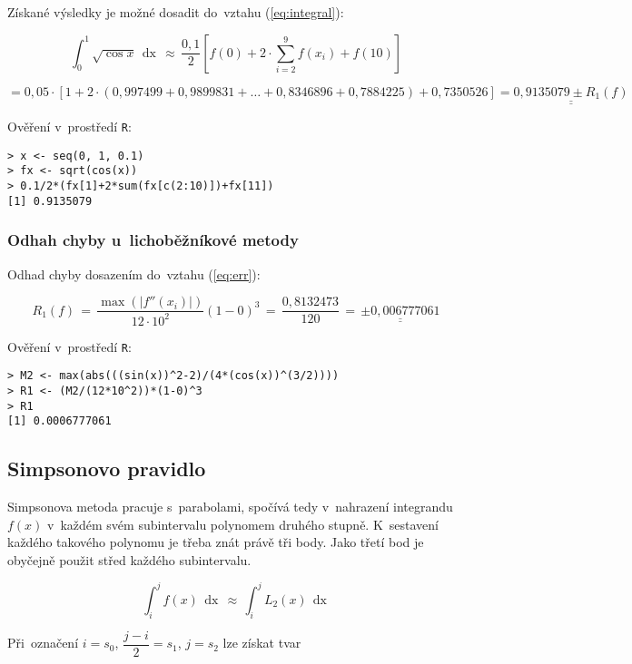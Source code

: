 \documentclass[a4paper,10pt]{article}
\def\doubleunderline#1{\underline{\underline{#1}}}
\def\d#1{\,\mathop{\mathrm{d}#1}}
\begin{document}
\par Získané výsledky je možné dosadit do~vztahu (\ref{eq:integral}):

\[
\int_{0}^{1}\sqrt{\cos{x}}\d{x}\,\approx\,\dfrac{0,1}{2}\left[
f(0)+2\cdot\sum_{i=2}^{9}f(x_i)+f(10)
\right]
\]

\[
=0,05\cdot\left[
1+
2\cdot(
0,997499+0,9899831+\dots+0,8346896+0,7884225
)
+0,7350526
\right]=\doubleunderline{0,9135079 \pm R_1(f)}
\]

\par Ověření v~prostředí \texttt{R}:

\begin{verbatim}
> x <- seq(0, 1, 0.1)
> fx <- sqrt(cos(x))
> 0.1/2*(fx[1]+2*sum(fx[c(2:10)])+fx[11])
[1] 0.9135079
\end{verbatim}

\subsubsection{Odhah chyby u~lichoběžníkové metody}
\par Odhad chyby dosazením do~vztahu (\ref{eq:err}):

\[
R_1(f)\,=\,\dfrac{\max(|f''(x_i)|)}{12\cdot10^2}(1-0)^3\,=\,\dfrac{0,8132473}{120}\,
=\,\doubleunderline{\pm0,006777061}
\]

\par Ověření v~prostředí \texttt{R}:

\begin{verbatim}
> M2 <- max(abs(((sin(x))^2-2)/(4*(cos(x))^(3/2))))
> R1 <- (M2/(12*10^2))*(1-0)^3
> R1
[1] 0.0006777061
\end{verbatim}

\newpage
\subsection{Simpsonovo pravidlo}

\par Simpsonova metoda pracuje s~parabolami, spočívá tedy v~nahrazení integrandu $f(x)$
v~každém svém subintervalu polynomem druhého stupně. K~sestavení každého takového polynomu
je třeba znát právě tři body. Jako třetí bod je obyčejně použit střed každého
subintervalu.

\begin{equation}
\int_{i}^{j}f(x)\d{x}\,\approx\,\int_{i}^{j}L_2(x)\d{x}
\end{equation}

\par Při~označení $i=s_0$, $\dfrac{j-i}{2}=s_1$, $j=s_2$ lze získat tvar
\end{document}
